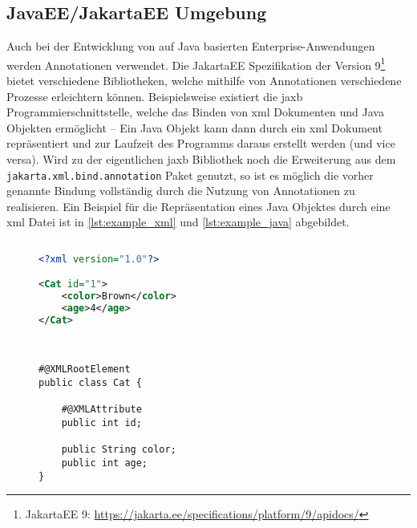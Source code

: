 \subsection{JavaEE/JakartaEE Umgebung}
\label{verwendung_im_umfeld_von_java_ee}
Auch bei der Entwicklung von auf Java basierten Enterprise-Anwendungen werden Annotationen verwendet. Die JakartaEE Spezifikation der Version 9\footnote{JakartaEE 9: \url{https://jakarta.ee/specifications/platform/9/apidocs/}} bietet verschiedene Bibliotheken, welche mithilfe von Annotationen verschiedene Prozesse erleichtern können. Beispielsweise existiert die \ac{jaxb} Programmierschnittstelle, welche das Binden von \ac{xml} Dokumenten und Java Objekten ermöglicht -- Ein Java Objekt kann dann durch ein \ac{xml} Dokument repräsentiert und zur Laufzeit des Programms daraus erstellt werden (und vice versa). Wird zu der eigentlichen \ac{jaxb} Bibliothek noch die Erweiterung aus dem \texttt{jakarta.xml.bind.annotation} Paket genutzt, so ist es möglich die vorher genannte Bindung vollständig durch die Nutzung von Annotationen zu realisieren. Ein Beispiel für die Repräsentation eines Java Objektes durch eine \ac{xml} Datei ist in \autoref{lst:example_xml} und \autoref{lst:example_java} abgebildet.

\begin{figure}[H]
	\noindent
	\begin{adjustbox}{minipage=[t]{.45\linewidth},gstore totalheight=\heightone,margin=\fboxsep+\fboxrule}
		\begin{lstlisting}[caption=Repräsentation als XML Datei., captionpos=b, language=XML, label=lst:example_xml]
	
<?xml version="1.0"?>

<Cat id="1">
	<color>Brown</color>
	<age>4</age>
</Cat>	

	
		\end{lstlisting}
	\end{adjustbox}\hfill
	\begin{adjustbox}{minipage=[t][\heightone]{0.5\linewidth}}
		\begin{lstlisting}[caption=Repräsentation als Java Objekt., captionpos=b, label=lst:example_java]
#@XMLRootElement
public class Cat {

	#@XMLAttribute
	public int id;
	
	public String color;
	public int age;
}
		\end{lstlisting}
	\end{adjustbox}
\end{figure}


